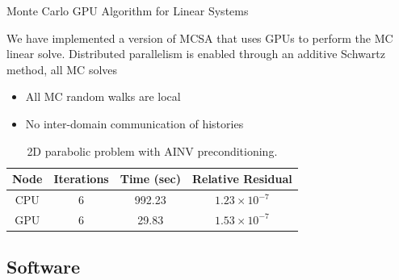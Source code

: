 \documentclass{beamer}
\begin{document}

\begin{frame}{Monte Carlo GPU Algorithm for Linear Systems}

  We have implemented a version of MCSA that uses GPUs to perform the MC
  linear solve.
  \vfill
  Distributed parallelism is enabled through an additive Schwartz method, all
  MC solves
  \begin{itemize}
  \item All MC random walks are local
  \item No inter-domain communication of histories
  \end{itemize}

  \begin{table}[h]
    \begin{center}
      \caption{2D parabolic problem with AINV preconditioning.}
      \begin{tabular}{cccc}
        \toprule
        Node & Iterations & Time (sec) & Relative Residual \\
        \midrule
        CPU & 6 & 992.23 & $1.23\times 10^{-7}$ \\
        GPU & 6 & 29.83 & $1.53\times 10^{-7}$ \\
        \bottomrule
      \end{tabular}
    \end{center}
  \end{table}

\end{frame}

\subsection{Software}
\end{document}
